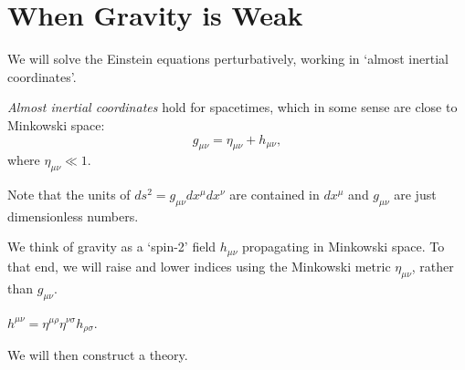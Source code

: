 \chapter{When Gravity is Weak}%
\label{cha:when_gravity_is_weak}

We will solve the Einstein equations perturbatively, working in `almost inertial coordinates'.
\begin{definition}[]
  \emph{Almost inertial coordinates} hold for spacetimes, which in some sense are close to Minkowski space:
  \begin{equation}
    g_{\mu\nu} = \eta_{\mu\nu} + h_{\mu\nu},
  \end{equation}
  where $\eta_{\mu\nu} \ll 1$.
\end{definition}
\begin{leftbar}
  \begin{note}
    Note that the units of $ds^2 = g_{\mu\nu} dx^{\mu} dx^{\nu}$ are contained in $dx^{\mu}$ and $g_{\mu\nu}$ are just dimensionless numbers.
  \end{note}
\end{leftbar}
We think of gravity as a `spin-2' field $h_{\mu\nu}$ propagating in Minkowski space. To that end, we will raise and lower indices using the Minkowski metric $\eta_{\mu\nu}$, rather than $g_{\mu\nu}$.
\begin{example}[]
  $h^{\mu\nu} = \eta^{\mu\rho} \eta^{\nu\sigma} h_{\rho\sigma}$.
\end{example}
We will then construct a theory.
